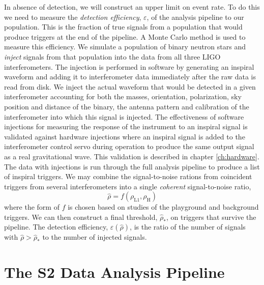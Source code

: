 In absence of detection, we will construct an upper limit on event rate.  To
do this we need to measure the \emph{detection efficiency}, $\varepsilon$, of
the analysis pipeline to our population. This is the fraction of true signals
from a population that would produce triggers at the end of the pipeline. A
Monte Carlo method is used to measure this efficiency. We simulate a
population of binary neutron stars and \emph{inject} signals from that
population into the data from all three LIGO interferometers. The injection is
performed in software by generating an inspiral waveform and adding it to
interferometer data immediately after the raw data is read from disk. We
inject the actual waveform that would be detected in a given interferometer
accounting for both the masses, orientation, polarization, sky position and
distance of the binary, the antenna pattern and calibration of the
interferometer into which this signal is injected.  The effectiveness of
software injections for measuring the response of the instrument to an
inspiral signal is validated against hardware injections where an inspiral
signal is added to the interferometer control servo during operation to
produce the same output signal as a real gravitational wave. This validation
is described in chapter \ref{ch:hardware}. The data with injections is run
through the full analysis pipeline to produce a list of inspiral triggers.
We may combine the signal-to-noise rations from coincident triggers from
several interferometers into a single \emph{coherent} signal-to-noise ratio,
\begin{equation}
\hat{\rho} = f(\rho_\mathrm{L1},\rho_\mathrm{H})
\end{equation}
where the form of $f$ is chosen based on studies of the playground and
background triggers. We can then construct a final threshold,
$\hat{\rho}_\ast$, on triggers that survive the pipeline. The detection
efficiency, $\varepsilon(\hat{\rho})$, is the ratio of the number of signals
with $\hat{\rho} > \hat{\rho}_\ast$  to the number of injected signals.

\section{The S2 Data Analysis Pipeline}
\label{s:s2pipeline}

